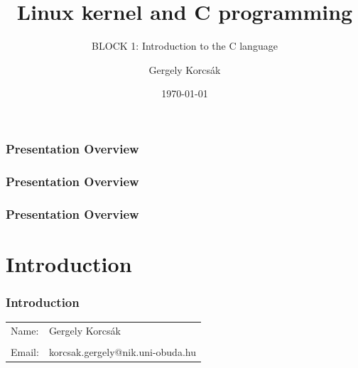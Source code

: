 \documentclass[
	11pt, %
]{beamer}
\title[Linux kernel and C programming]{Linux kernel and C programming}
\subtitle{BLOCK 1: Introduction to the C language}
\author[Gergely Korcsák]{Gergely Korcsák}
\institute[OE NIK]{Óbuda University \\ \smallskip \textit{korcsak.gergely@nik.uni-obuda.hu}}
\date[\today]{\today}
\begin{document}

\begin{frame}
	\titlepage
\end{frame}


\begin{frame}
	\frametitle{Presentation Overview} %

	\tableofcontents[pausesections,sections={1}] %
\end{frame}

\begin{frame}
	\frametitle{Presentation Overview}
	\tableofcontents[pausesections,sections={2}]
\end{frame}

\begin{frame}
	\frametitle{Presentation Overview}
	\tableofcontents[pausesections,sections={3}]
	\tableofcontents[pausesections,sections={4}]
\end{frame}


\section{Introduction}

\begin{frame}
	\frametitle{Introduction}

    \begin{table}[h]
        \begin{tabular}{p{}p{}}
            Name:   & Gergely Korcsák \\
            \\
            Email:  & korcsak.gergely@nik.uni-obuda.hu \\
        \end{tabular}
    \end{table}

\end{frame}
\end{document}

